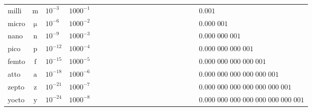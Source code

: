 \begin{tabular}{|l|c|l|l|l|}
    milli & $\si{\milli} $ & ${10}^{ -3}$ & ${1000}^{-1  }$ & $\phantom{0\;000\;000\;000\;000\;000\;000\;000\;00}
                                                                        0.001$ \\ \cline{5-5}
    micro & $\si{\micro} $ & ${10}^{ -6}$ & ${1000}^{-2  }$ & $\phantom{0\;000\;000\;000\;000\;000\;000\;000\;00}
                                                                        0.000\;001$ \\ \cline{5-5}
    nano  & $\si{\nano } $ & ${10}^{ -9}$ & ${1000}^{-3  }$ & $\phantom{0\;000\;000\;000\;000\;000\;000\;000\;00}
                                                                        0.000\;000\;001$ \\ \cline{5-5}
    pico  & $\si{\pico } $ & ${10}^{-12}$ & ${1000}^{-4  }$ & $\phantom{0\;000\;000\;000\;000\;000\;000\;000\;00}
                                                                        0.000\;000\;000\;001$ \\ \cline{5-5}
    femto & $\si{\femto} $ & ${10}^{-15}$ & ${1000}^{-5  }$ & $\phantom{0\;000\;000\;000\;000\;000\;000\;000\;00}
                                                                        0.000\;000\;000\;000\;001$ \\ \cline{5-5}
    atto  & $\si{\atto } $ & ${10}^{-18}$ & ${1000}^{-6  }$ & $\phantom{0\;000\;000\;000\;000\;000\;000\;000\;00}
                                                                        0.000\;000\;000\;000\;000\;001$ \\ \cline{5-5}
    zepto & $\si{\zepto} $ & ${10}^{-21}$ & ${1000}^{-7  }$ & $\phantom{0\;000\;000\;000\;000\;000\;000\;000\;00}
                                                                        0.000\;000\;000\;000\;000\;000\;001$ \\ \cline{5-5}
    yocto & $\si{\yocto} $ & ${10}^{-24}$ & ${1000}^{-8  }$ & $\phantom{0\;000\;000\;000\;000\;000\;000\;000\;00}
                                                                        0.000\;000\;000\;000\;000\;000\;000\;001$ \\
    \hline
\end{tabular}

